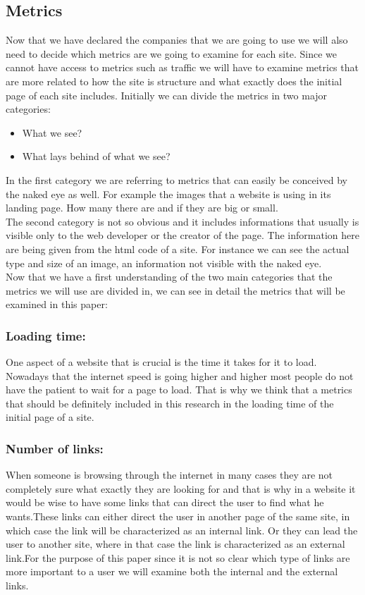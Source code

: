 \documentclass{article}
\begin{document}
\subsection{Metrics}
Now that we have declared the companies that we are going to use we will also need to decide which metrics are we going to examine for each site. Since we cannot have access to metrics such as traffic we will have to examine metrics that are more related to how the site is structure and what exactly does the initial page of each site includes. Initially we can divide the metrics in two major categories:
\begin{itemize}
\item What we see?
\item What lays behind of what we see?
\end{itemize}
In the first category we are referring to metrics that can easily be conceived by the naked eye as well. For example the images that a website is using in its landing page. How many there are and if they are big or small.\\
The second category is not so obvious and it includes informations that usually is visible only to the web developer or the creator of the page. The information here are being given from the html code of a site. For instance we can see the actual type and size of an image, an information not visible with the naked eye.\\
Now that we have a first understanding of the two main categories that the metrics we will use are divided in, we can see in detail the metrics that will be examined in this paper:
\subsubsection{Loading time:}\label{M:Loading time}
One aspect of a website that is crucial is the time it takes for it to load. Nowadays that the internet speed is going higher and higher most people do not have the patient to wait for a page to load. That is why we think that a metrics that should be definitely included in this research in the loading time of the initial page of a site.
\subsubsection{Number of links:}\label{M:Number of links}
When someone is browsing through the internet in many cases they are not completely sure what exactly they are looking for and that is why in a website it would be wise to have some links that can direct the user to find what he wants.These links can either direct the user in another page of the same site, in which case the link will be characterized as an internal link. Or they can lead the user to another site, where in that case the link is characterized as an external link.For the purpose of this paper since it is not so clear which type of links are more important to a user we will examine both the internal and the external links.
\end{document}
